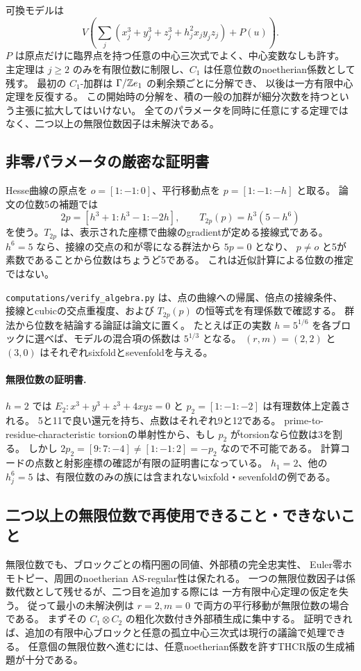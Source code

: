 可換モデルは
\[
 V\!\left(\sum_j(x_j^3+y_j^3+z_j^3+h_j^2x_jy_jz_j)+P(u)\right).
\]
\(P\) は原点だけに臨界点を持つ任意の中心三次式でよく、中心変数なしも許す。
主定理は \(j\ge2\) のみを有限位数に制限し、\(C_1\) は任意位数のnoetherian係数として残す。
最初の \(C_1\)-加群は \(\Gamma/\mathbb Z e_1\) の剰余類ごとに分解でき、
以後は一方有限中心定理を反復する。
この開始時の分解を、積の一般の加群が細分次数を持つという主張に拡大してはいけない。
全てのパラメータを同時に任意にする定理ではなく、二つ以上の無限位数因子は未解決である。

\subsection{非零パラメータの厳密な証明書}

Hesse曲線の原点を \(o=[1:-1:0]\)、平行移動点を \(p=[1:-1:-h]\) と取る。
論文の位数5の補題では
\[
 2p=[h^3+1:h^3-1:-2h],\qquad
 T_{2p}(p)=h^3(5-h^6)
\]
を使う。\(T_{2p}\) は、表示された座標で曲線のgradientが定める接線式である。
\(h^6=5\) なら、接線の交点の和が零になる群法から \(5p=0\) となり、
\(p\ne o\) と5が素数であることから位数はちょうど5である。
これは近似計算による位数の推定ではない。

\texttt{computations/verify\_algebra.py} は、点の曲線への帰属、倍点の接線条件、
接線とcubicの交点重複度、および \(T_{2p}(p)\) の恒等式を有理係数で確認する。
群法から位数を結論する論証は論文に置く。
たとえば正の実数 \(h=5^{1/6}\) を各ブロックに選べば、モデルの混合項の係数は \(5^{1/3}\) となる。
\((r,m)=(2,2)\) と \((3,0)\) はそれぞれsixfoldとsevenfoldを与える。

\paragraph{無限位数の証明書.}
\(h=2\) では \(E_2:x^3+y^3+z^3+4xyz=0\) と \(p_2=[1:-1:-2]\) は有理数体上定義される。
5と11で良い還元を持ち、点数はそれぞれ9と12である。
prime-to-residue-characteristic torsionの単射性から、もし \(p_2\) がtorsionなら位数は3を割る。
しかし \(2p_2=[9:7:-4]\ne[1:-1:2]=-p_2\) なので不可能である。
計算コードの点数と射影座標の確認が有限の証明書になっている。
\(h_1=2\)、他の \(h_j^6=5\) は、有限位数のみの族には含まれないsixfold・sevenfoldの例である。

\subsection{二つ以上の無限位数で再使用できること・できないこと}

無限位数でも、ブロックごとの楕円圏の同値、外部積の完全忠実性、
Euler零ホモトピー、周囲のnoetherian AS-regular性は保たれる。
一つの無限位数因子は係数代数として残せるが、二つ目を追加する際には
一方有限中心定理の仮定を失う。
従って最小の未解決例は \(r=2,m=0\) で両方の平行移動が無限位数の場合である。
まずその \(C_1\otimes C_2\) の粗化次数付き外部積生成に集中する。
証明できれば、追加の有限中心ブロックと任意の孤立中心三次式は現行の議論で処理できる。
任意個の無限位数へ進むには、任意noetherian係数を許すTHCR版の生成補題が十分である。

